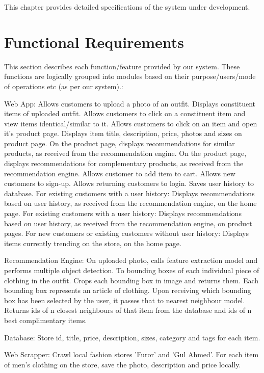 This chapter provides detailed specifications of the system under development.

\section{Functional Requirements}

This section describes each function/feature provided by our system. These functions are logically grouped into modules based on their purpose/users/mode of operations etc (as per our system).:
\begin{outline}
  \1 Web App:
  \2 Allows customers to upload a photo of an outfit.
  \2 Displays constituent items of uploaded outfit.
  \2 Allows customers to click on a constituent item and view items identical/similar to it.
  \2 Allows customers to click on an item and open it's product page.
  \2 Displays item title, description, price, photos and sizes on product page.
  \2 On the product page, displays recommendations for similar products, as received from the recommendation engine.
  \2 On the product page, displays recommendations for complementary products, as received from the recommendation engine.
  \2 Allows customer to add item to cart.
  \2 Allows new customers to sign-up.
  \2 Allows returning customers to login.
  \2 Saves user history to database.
  \2 For existing customers with a user history: Displays recommendations based on user history, as received from the recommendation engine, on the home page.
  \2 For existing customers with a user history: Displays recommendations based on user history, as received from the recommendation engine, on product pages.
  \2 For new customers or existing customers without user history: Displays items currently trending on the store, on the home page.
  
  \1 Recommendation Engine:
  \2 On uploaded photo, calls feature extraction model and performs multiple object detection. To bounding boxes of each individual piece of clothing in the outfit.
  \2 Crops each bounding box in image and returns them. Each bounding box represents an article of clothing.
  \2 Upon receiving which bounding box has been selected by the user, it passes that to nearest neighbour model. Returns ids of n closest neighbours of that item from the database and ids of n best complimentary items.
  
  \1 Database:
  \2 Store id, title, price, description, sizes, category and tags for each item.
  
  \1 Web Scrapper:
  \2 Crawl local fashion stores 'Furor' and 'Gul Ahmed'.
  \2 For each item of men's clothing on the store, save the photo, description and price locally.

\end{outline}

